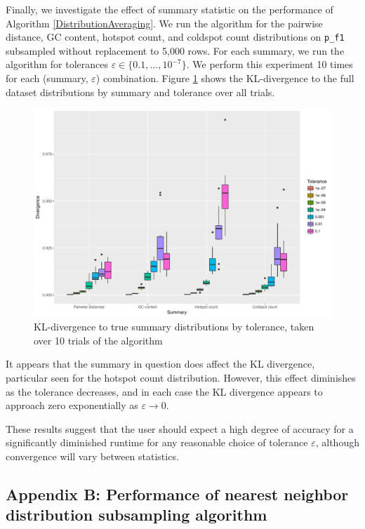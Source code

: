 \documentclass{article}
\begin{document}
Finally, we investigate the effect of summary statistic on the performance of Algorithm \ref{DistributionAveraging}.
We run the algorithm for the pairwise distance, GC content, hotspot count, and coldspot count distributions on \texttt{p\_f1} subsampled without replacement to 5,000 rows.
For each summary, we run the algorithm for tolerances $\varepsilon \in \{0.1, \dotsc, 10^{-7}\}$.
We perform this experiment 10 times for each (summary, $\varepsilon$) combination.
Figure \ref{fig:SummaryPerformance} shows the KL-divergence to the full dataset distributions by summary and tolerance over all trials.
\begin{figure}
    \includegraphics[width=\linewidth]{Figures/Multiple/div_by_summary_and_tol.pdf}
    \caption{KL-divergence to true summary distributions by tolerance, taken over 10 trials of the algorithm}
    \label{fig:SummaryPerformance}
\end{figure}
It appears that the summary in question does affect the KL divergence, particular seen for the hotspot count distribution.
However, this effect diminishes as the tolerance decreases, and in each case the KL divergence appears to approach zero exponentially as $\varepsilon \to 0$. 

These results suggest that the user should expect a high degree of accuracy for a significantly diminished runtime for any reasonable choice of tolerance $\varepsilon$, although convergence will vary between statistics.

\subsection*{Appendix B: Performance of nearest neighbor distribution subsampling algorithm}
\end{document}
